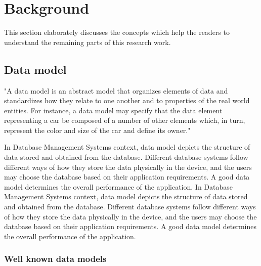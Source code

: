 

	\let\cleardoublepage\clearpage
    \chapter{Background} \label{background}
    This section elaborately discusses the concepts which help the readers to understand the remaining parts of this research work.
    
    \section{Data model}
    
    "A data model is an abstract model that organizes elements of data and standardizes how they relate to one another and to properties of the real world entities. For instance, a data model may specify that the data element representing a car be composed of a number of other elements which, in turn, represent the color and size of the car and define its owner." \cite{misc08}
    
    In Database Management Systems context, data model depicts the structure of data stored and obtained from the database. Different database systems follow different ways of how they store the data physically in the device, and the users may choose the database based on their application requirements. A good data model determines the overall performance of the application. In Database Management Systems context, data model depicts the structure of data stored and obtained from the database. Different database systems follow different ways of how they store the data physically in the device, and the users may choose the database based on their application requirements. A good data model determines the overall performance of the application. 
    
    \subsection{Well known data models}
    
